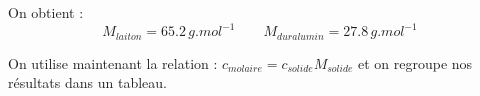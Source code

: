 \documentclass[12pt]{article}
\begin{document}
	
On obtient :
\begin{equation}
M_{laiton}=65.2\, g.mol^{-1} \quad \quad M_{duralumin}=27.8\, g.mol^{-1}
\end{equation}

On utilise maintenant la relation : $c_{molaire}=c_{solide}M_{solide}$ et on regroupe nos résultats dans un tableau.
\begin{table}[h!]
	\begin{tabular}{|c|c|c|c|c|}
	
	\end{tabular}

\end{table}
\end{document}
